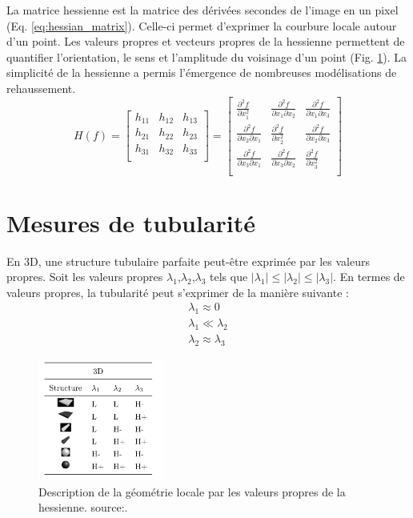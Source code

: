 La matrice hessienne est la matrice des dérivées secondes de l'image en un pixel (Eq. \ref{eq:hessian_matrix}). Celle-ci permet d'exprimer la courbure locale autour d'un point.
Les valeurs propres et vecteurs propres de la hessienne permettent de quantifier l'orientation, le sens et l'amplitude du voisinage d'un point (Fig. \ref{fig:structures_hessienne}).
La simplicité de la hessienne a permis l'émergence de nombreuses modélisations de rehaussement.
\begin{equation}
  H(f) =
  \begin{bmatrix}
  h_{11} & h_{12} & h_{13} \\
  h_{21} & h_{22} & h_{23} \\
  h_{31} & h_{32} & h_{33} \\
  \end{bmatrix}
    =
  \begin{bmatrix}
  \frac{\partial^2 f}{\partial x^2_1} & \frac{\partial^2 f}{\partial x_1 \partial x_2} & \frac{\partial^2 f}{\partial x_1 \partial x_3} \\
  \frac{\partial^2 f}{\partial x_2 \partial x_1} & \frac{\partial^2 f}{\partial x^2_2} & \frac{\partial^2 f}{\partial x_2 \partial x_3} \\
  \frac{\partial^2 f}{\partial x_3 \partial x_1} & \frac{\partial^2 f}{\partial x_3 \partial x_2} & \frac{\partial^2 f}{\partial x^2_3} \\
  \end{bmatrix}
  \label{eq:hessian_matrix}
\end{equation}

\section{Mesures de tubularité}
En 3D, une structure tubulaire parfaite peut-être exprimée par les valeurs propres. Soit les valeurs propres $\lambda_1$,$\lambda_2$,$\lambda_3$ tels que $|\lambda_1| \leq |\lambda_2| \leq |\lambda_3|$.  En termes de valeurs propres, la tubularité peut s'exprimer de la manière suivante \cite{Lorenz1997_multi} :
\begin{align}
  \lambda_1 \approx 0 \\
  \lambda_1 \ll \lambda_2 \\
  \lambda_2 \approx \lambda_3
\end{align}

\begin{figure}[!ht]
  \centering
  \includegraphics[height=4cm]{Images/table_structures_jerman.png}
  \caption{Description de la géométrie locale par les valeurs propres de la hessienne. source:\cite{Jerman2015_beyond_frangi}.}
  \label{fig:structures_hessienne}
\end{figure}

